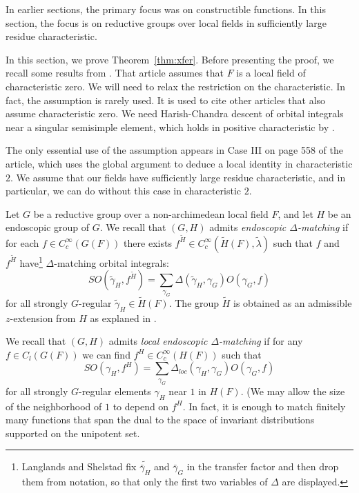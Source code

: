 \documentclass[12pt]{amsart}
\theoremstyle{plain}
\theoremstyle{definition}
\begin{document}
In earlier sections, the primary focus was on constructible
functions.  In this section, the focus is on reductive groups over
local fields in sufficiently large residue characteristic.


In this section, we prove Theorem~\ref{thm:xfer}.
Before presenting the proof, we recall some results from \cite{LSd}.
That article assumes that $F$ is a local field of characteristic zero.
We will need to relax the restriction on the characteristic.  In fact,
the assumption is rarely used.  It is used to cite other articles that
also assume characteristic zero.  We need Harish-Chandra descent of
orbital integrals near a singular semisimple element, which holds in
positive characteristic by \cite{XX}.

The only essential use of the assumption appears in Case III on page
558 of the article, which uses the global argument to deduce a local
identity in characteristic $2$.  We assume that our fields have
sufficiently large residue characteristic, and in particular, we can
do without this case in characteristic $2$.

Let $G$ be a reductive group over a non-archimedean local field $F$,
and let $H$ be an endoscopic group of $G$.    We recall \cite[Sec.2.1]{LSd} that $(G,H)$
admits {\it endoscopic $\Delta$-matching} if for each $f\in
C_c^\infty(G(F))$ there exists $f^{\tilde H}\in C_c^\infty(\tilde
H(F),\tilde \lambda)$ such that $f$ and $f^{\tilde H}$
have\footnote{Langlands and Shelstad fix $\tilde{\bar \gamma_H}$ and
  $\bar\gamma_G$ in the transfer factor and then drop them from
  notation, so that only the first two variables of $\Delta$ are displayed.}
$\Delta$-matching orbital integrals:
\[
SO(\tilde \gamma_H,f^{\tilde H}) 
 = \sum_{\gamma_G} \Delta(\tilde\gamma_H,\gamma_G)O(\gamma_G,f)
\]
for all strongly $G$-regular $\tilde \gamma_H \in \tilde H(F)$.
The group $\tilde H$ is obtained as an admissible $z$-extension from
$H$ as explaned in \cite[Sec. 4.4]{LSxf}.

We recall that $(G,H)$ admits {\it local endoscopic $\Delta$-matching}
if for any $f\in C_l(G(F))$ we can find $f^H \in C_c^\infty(H(F))$
such that
\[
SO( \gamma_H,f^{ H}) 
 = \sum_{\gamma_G} \Delta_{loc}(\gamma_H,\gamma_G)O(\gamma_G,f)
\]
for all strongly $G$-regular elements $\gamma_H$ near $1$ in $H(F)$.
(We may allow the size of the neighborhood of $1$ to depend on $f^H$.
In fact, it is enough to match finitely many functions that span the
dual to the space of invariant distributions supported on the
unipotent set.
\end{document}
